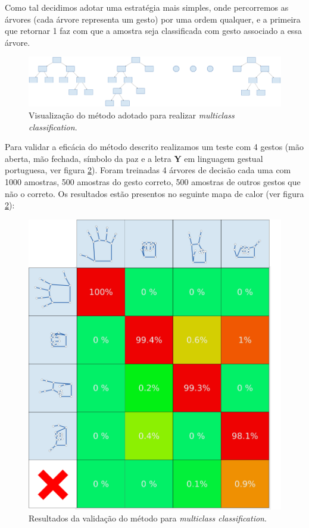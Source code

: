 \documentclass{TTUPhD}
\begin{document}
Como tal decidimos adotar uma estratégia mais simples, onde percorremos as árvores (cada árvore representa um gesto) por uma ordem qualquer, e a primeira que retornar 1
faz com que a amostra seja classificada com gesto associado a essa árvore.

\vspace{0.2cm}
\begin{figure}[h!]
    \center
    \includegraphics[scale=0.04]{./img/multiclass_classification.jpg}
    \vspace{0.2cm}
    \caption{Visualização do método adotado para realizar \textit{multiclass classification}.}
    \label{fig:multiclass}
\end{figure}

Para validar a eficácia do método descrito realizamos um teste com 4 gestos (mão aberta, mão fechada, símbolo da paz e a letra \textbf{Y} em linguagem gestual portuguesa,
ver figura \ref{fig:heat_map}).
Foram treinadas 4 árvores de decisão cada uma com 1000 amostras, 500 amostras do gesto correto, 500 amostras de outros gestos que não o correto.
Os resultados estão presentos no seguinte mapa de calor (ver figura \ref{fig:heat_map}):

\begin{figure}[h!]
    \center
    \includegraphics[scale=0.3]{./img/heat_map.png}
    \caption{Resultados da validação do método para \textit{multiclass classification}.}
    \label{fig:heat_map}
\end{figure}
\end{document}
